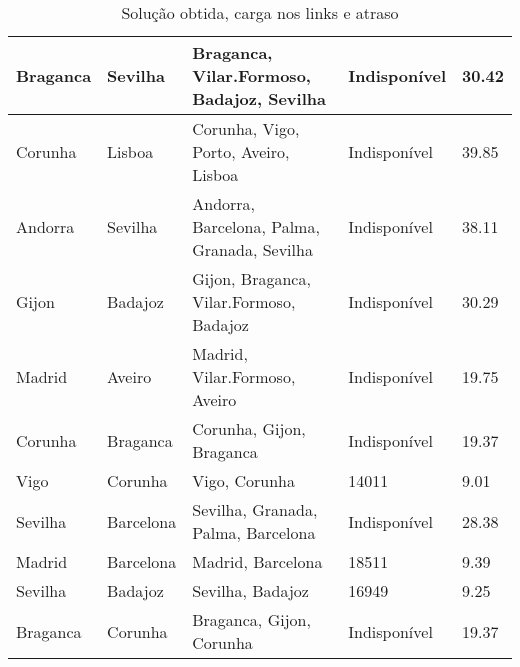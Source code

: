 \begin{table}[!htb]
{\begin{tabular}{|l|l|l|l|l|}
Braganca & Sevilha & Braganca, Vilar.Formoso, Badajoz, Sevilha & Indisponível & 30.42 \\ \hline
Corunha & Lisboa & Corunha, Vigo, Porto, Aveiro, Lisboa & Indisponível & 39.85 \\ \hline
Andorra & Sevilha & Andorra, Barcelona, Palma, Granada, Sevilha & Indisponível & 38.11 \\ \hline
Gijon & Badajoz & Gijon, Braganca, Vilar.Formoso, Badajoz & Indisponível & 30.29 \\ \hline
Madrid & Aveiro & Madrid, Vilar.Formoso, Aveiro & Indisponível & 19.75 \\ \hline
Corunha & Braganca & Corunha, Gijon, Braganca & Indisponível & 19.37 \\ \hline
Vigo & Corunha & Vigo, Corunha & 14011 & 9.01 \\ \hline
Sevilha & Barcelona & Sevilha, Granada, Palma, Barcelona & Indisponível & 28.38 \\ \hline
Madrid & Barcelona & Madrid, Barcelona & 18511 & 9.39 \\ \hline
Sevilha & Badajoz & Sevilha, Badajoz & 16949 & 9.25 \\ \hline
Braganca & Corunha & Braganca, Gijon, Corunha & Indisponível & 19.37 \\ \hline
\end{tabular}}
\caption[]{Solução obtida, carga nos links e atraso}
\end{table}

